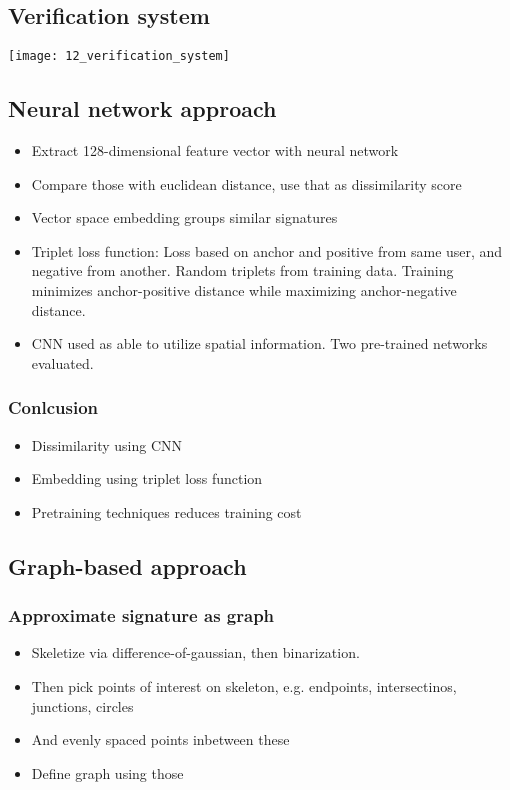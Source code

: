 \subsection{Verification system}

\texttt{[image: 12\_verification\_system]}

\subsection{Neural network approach}

\begin{itemize}
		\item Extract 128-dimensional feature vector with neural network
		\item Compare those with euclidean distance, use that as dissimilarity
				score
		\item Vector space embedding groups similar signatures
		\item Triplet loss function: Loss based on anchor and positive from
				same user, and negative from another. Random triplets from
				training data. Training minimizes anchor-positive distance
				while maximizing anchor-negative distance.
		\item CNN used as able to utilize spatial information. Two pre-trained
				networks evaluated.
\end{itemize}

\subsubsection{Conlcusion}

\begin{itemize}
		\item Dissimilarity using CNN
		\item Embedding using triplet loss function
		\item Pretraining techniques reduces training cost
\end{itemize}

\subsection{Graph-based approach}

\subsubsection{Approximate signature as graph}

\begin{itemize}
		\item Skeletize via difference-of-gaussian, then binarization.
		\item Then pick points of interest on skeleton, e.g. endpoints, intersectinos, junctions, circles
		\item And evenly spaced points inbetween these
		\item Define graph using those
\end{itemize}

